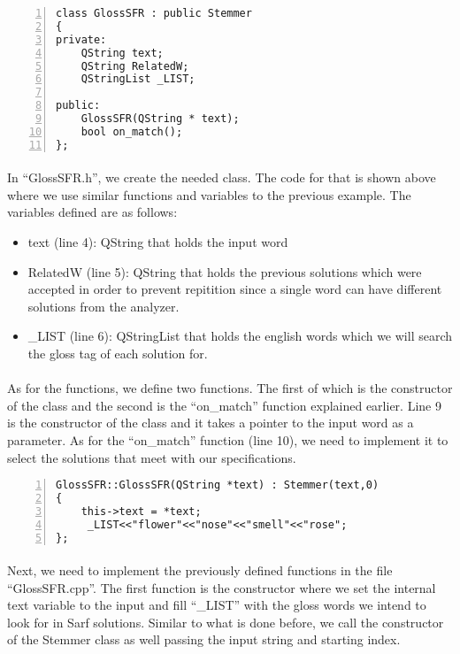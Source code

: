 \documentclass{article}
\begin{document}
\begin{Verbatim}[numbers=left]
class GlossSFR : public Stemmer
{
private:
    QString text;
    QString RelatedW;
    QStringList _LIST;

public:
    GlossSFR(QString * text);
    bool on_match();
};
\end{Verbatim}

\paragraph{}
In ``GlossSFR.h'', we create the needed class. The code for that is shown above where we use similar functions and variables to the previous example. The variables defined are as follows:

\begin{itemize}
\item text (line 4): QString that holds the input word
\item RelatedW (line 5): QString that holds the previous solutions which were accepted in order to prevent repitition since a single word can have different solutions from the analyzer.
\item \_LIST (line 6): QStringList that holds the english words which we will search the gloss tag of each solution for.
\end{itemize}

\paragraph{}
As for the functions, we define two functions. The first of which is the constructor of the class and the second is the ``on\_match'' function explained earlier. Line 9 is the constructor of the class and it takes a pointer to the input word as a parameter. As for the ``on\_match'' function (line 10), we need to implement it to select the solutions that meet with our specifications.

\begin{Verbatim}[numbers=left]
GlossSFR::GlossSFR(QString *text) : Stemmer(text,0)
{
    this->text = *text;
     _LIST<<"flower"<<"nose"<<"smell"<<"rose";
};
\end{Verbatim}

\paragraph{}
Next, we need to implement the previously defined functions in the file ``GlossSFR.cpp''. The first function is the constructor where we set the internal text variable to the input and fill ``\_LIST'' with the gloss words we intend to look for in Sarf solutions. Similar to what is done before, we call the constructor of the Stemmer class as well passing the input string and starting index.
\end{document}

